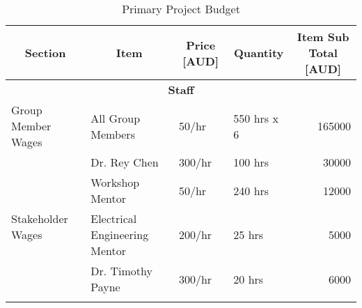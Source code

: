 \begin{table}[h]
\caption{Primary Project Budget}
\label{tab:Budget}
\centering
\resizebox{1\textwidth}{!}
{
\begin{tabular}{|l|l|l|l|r|}
\hline
\multicolumn{1}{|c|}{Section}                      & \multicolumn{1}{c|}{Item}          & \multicolumn{1}{c|}{Price {[}AUD{]}} & \multicolumn{1}{c|}{Quantity} & \multicolumn{1}{c|}{Item Sub Total {[}AUD{]}} \\ \hline
\multicolumn{5}{|c|}{\textbf{Staff}}                                                                                                                                                                           \\ \hline
\multirow{5}{*}{Group Member Wages}                & \multirow{5}{*}{All Group Members} & \multirow{5}{*}{50/hr}               & \multirow{5}{*}{550 hrs x 6}  & \multirow{5}{*}{165000}                       \\
                                                   &                                    &                                      &                               &                                               \\
                                                   &                                    &                                      &                               &                                               \\
                                                   &                                    &                                      &                               &                                               \\
                                                   &                                    &                                      &                               &                                               \\ \hline
\multirow{5}{*}{Stakeholder Wages}                  & Dr. Rey Chen                           & 300/hr                                  & 100 hrs                       & 30000                                             \\ \cline{2-5} 
                                                   & Workshop Mentor                    & 50/hr                                & 240 hrs                       & 12000                                         \\ \cline{2-5} 
                                                   & Electrical Engineering Mentor       & 200/hr                                  & 25 hrs                        &  \multicolumn{1}{r|}{5000}                         \\ \cline{2-5} & Dr. Timothy Payne                      & 300/hr                               & 20 hrs                        & 6000                                             \\ \cline{2-5} 

\end{tabular}}
\end{table}
